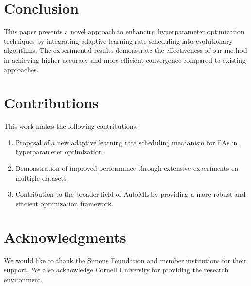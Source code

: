 \documentclass{article}
\begin{document}
\section{Conclusion}
This paper presents a novel approach to enhancing hyperparameter optimization techniques by integrating adaptive learning rate scheduling into evolutionary algorithms. The experimental results demonstrate the effectiveness of our method in achieving higher accuracy and more efficient convergence compared to existing approaches.

\section{Contributions}
This work makes the following contributions:
\begin{enumerate}
    \item Proposal of a new adaptive learning rate scheduling mechanism for EAs in hyperparameter optimization.
    \item Demonstration of improved performance through extensive experiments on multiple datasets.
    \item Contribution to the broader field of AutoML by providing a more robust and efficient optimization framework.
\end{enumerate}

\section*{Acknowledgments}
We would like to thank the Simons Foundation and member institutions for their support. We also acknowledge Cornell University for providing the research environment.



\end{document}
